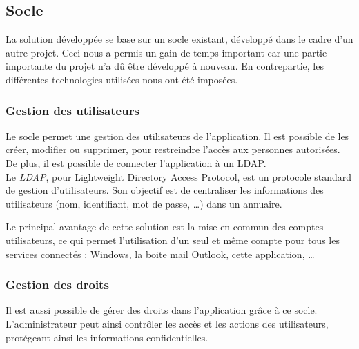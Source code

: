 
\subsection{Socle}

La solution développée se base sur un socle existant, développé dans le cadre d'un autre projet.
Ceci nous a permis un gain de temps important car une partie importante du projet n'a dû être développé à nouveau.
En contrepartie, les différentes technologies utilisées nous ont été imposées.


\subsubsection{Gestion des utilisateurs}

Le socle permet une gestion des utilisateurs de l'application.
Il est possible de les créer, modifier ou supprimer, pour restreindre l'accès aux personnes autorisées.
De plus, il est possible de connecter l'application à un LDAP.
\\

Le \textit{LDAP}, pour Lightweight Directory Access Protocol, est un protocole standard de gestion d'utilisateurs.
Son objectif est de centraliser les informations des utilisateurs (nom, identifiant, mot de passe, \ldots) dans un annuaire.

Le principal avantage de cette solution est la mise en commun des comptes utilisateurs, ce qui permet l'utilisation d'un seul et même compte pour tous les services connectés : Windows, la boite mail Outlook, cette application, \ldots


\subsubsection{Gestion des droits}

Il est aussi possible de gérer des droits dans l'application grâce à ce socle.
L'administrateur peut ainsi contrôler les accès et les actions des utilisateurs, protégeant ainsi les informations confidentielles.
\\

